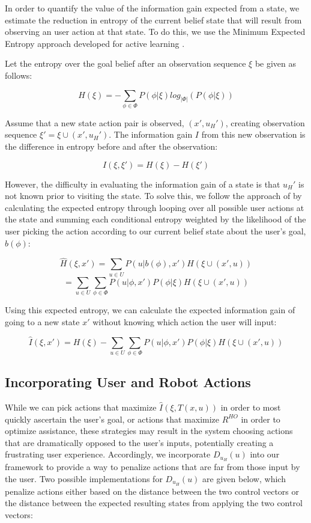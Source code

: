 \documentclass[conference]{IEEEtran}
\begin{document}
In order to quantify the value of the information gain expected from a state, we estimate the reduction in entropy of the current belief state that will result from observing an user action at that state. To do this, we use the Minimum Expected Entropy approach developed for active learning \cite{holub2008entropy}.

Let the entropy over the goal belief after an observation sequence $\xi$ be given as follows:

\[
H(\xi) = -\sum_{\phi \in \Phi} P(\phi|\xi)log_{|\Phi|}(P(\phi|\xi))
\]

Assume that a new state action pair is observed, $(x',u_H')$, creating observation sequence $\xi' = \xi \cup (x', u_H')$. The information gain $I$ from this new observation is the difference in entropy before and after the observation:

\[
I(\xi, \xi') = H(\xi) - H(\xi')
\]

However, the difficulty in evaluating the information gain of a state is that $u_H'$ is not known prior to visiting the state. To solve this, we follow the approach of \citet{holub2008entropy} by calculating the expected entropy through looping over all possible user actions at the state and summing each conditional entropy weighted by the likelihood of the user picking the action according to our current belief state about the user's goal, $b(\phi)$:

\[
\hat{H}(\xi, x') = \sum_{u \in U} P(u|b(\phi),x')H(\xi \cup (x', u))
\]
\[
= \sum_{u \in U} \sum_{\phi \in \Phi} P(u|\phi,x')P(\phi|\xi)H(\xi \cup (x', u))
\]

Using this expected entropy, we can calculate the expected information gain of going to a new state $x'$ without knowing which action the user will input:

\[
\hat{I}(\xi, x') = H(\xi) - \sum_{u \in U} \sum_{\phi \in \Phi} P(u|\phi,x')P(\phi|\xi)H(\xi \cup (x', u))
\]

\subsection{Incorporating User and Robot Actions}
While we can pick actions that maximize $\hat{I}(\xi, T(x,u))$ in order to most quickly ascertain the user's goal, or actions that maximize $R^{HO}$ in order to optimize assistance, these strategies may result in the system choosing actions that are dramatically opposed to the user's inputs, potentially creating a frustrating user experience. Accordingly, we incorporate $D_{u_H}(u)$ into our framework to provide a way to penalize actions that are far from those input by the user. Two possible implementations for $D_{u_H}(u)$ are given below, which penalize actions either based on the distance between the two control vectors or the distance between the expected resulting states from applying the two control vectors:
\end{document}
